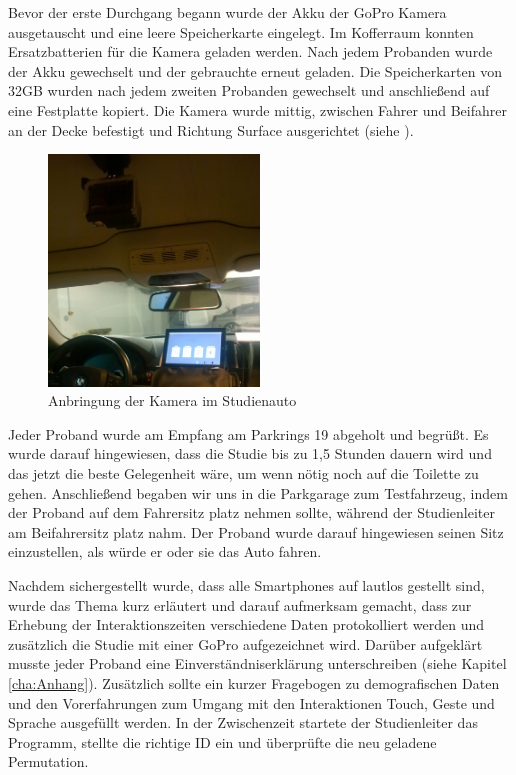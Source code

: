 Bevor der erste Durchgang begann wurde der Akku der GoPro Kamera ausgetauscht und eine leere Speicherkarte eingelegt. 
Im Kofferraum konnten Ersatzbatterien für die Kamera geladen werden. 
Nach jedem Probanden wurde der Akku gewechselt und der gebrauchte erneut geladen. 
Die Speicherkarten von 32GB wurden nach jedem zweiten Probanden gewechselt und anschließend auf eine Festplatte kopiert. 
Die Kamera wurde mittig, zwischen Fahrer und Beifahrer an der Decke befestigt und Richtung Surface ausgerichtet (siehe ).
\begin{figure}[ht]
  \centering
  \includegraphics[width=0.5\textwidth]{img/Kamera3.jpg}
  \caption{Anbringung der Kamera im Studienauto}
  \label{fig:Kamera}
\end{figure} 

Jeder Proband wurde am Empfang am Parkrings 19 abgeholt und begrüßt.
Es wurde darauf hingewiesen, dass die Studie bis zu 1,5 Stunden dauern wird und das jetzt die beste Gelegenheit wäre, um wenn nötig noch auf die Toilette zu gehen.
Anschließend begaben wir uns in die Parkgarage zum Testfahrzeug, indem der Proband auf dem Fahrersitz platz nehmen sollte, während der Studienleiter am Beifahrersitz platz nahm.
Der Proband wurde darauf hingewiesen seinen Sitz einzustellen, als würde er oder sie das Auto fahren.

Nachdem sichergestellt wurde, dass alle Smartphones auf lautlos gestellt sind, wurde das Thema kurz erläutert und darauf aufmerksam gemacht, dass zur Erhebung der Interaktionszeiten verschiedene Daten protokolliert werden und zusätzlich die Studie mit einer GoPro aufgezeichnet wird.
Darüber aufgeklärt musste jeder Proband eine Einverständniserklärung unterschreiben (siehe Kapitel \ref{cha:Anhang}).
Zusätzlich sollte ein kurzer Fragebogen zu demografischen Daten und den Vorerfahrungen zum Umgang mit den Interaktionen Touch, Geste und Sprache ausgefüllt werden.
In der Zwischenzeit startete der Studienleiter das Programm, stellte die richtige ID ein und überprüfte die neu geladene Permutation.

